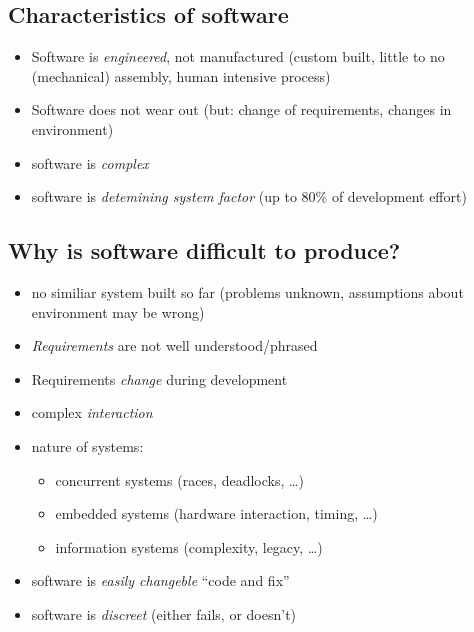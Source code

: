 \documentclass[a4paper, 10pt]{article}
\begin{document}
\subsection{Characteristics of software}
\begin{itemize}
	\item Software is \emph{engineered}, not manufactured (custom built, little to no (mechanical) assembly, human intensive process)
	\item Software does not wear out (but: change of requirements, changes in environment)
	\item software is \emph{complex}
	\item software is \emph{detemining system factor} (up to 80\% of development effort)
\end{itemize}

\subsection{Why is software difficult to produce?}
\begin{itemize}
	\item no similiar system built so far (problems unknown, assumptions about environment may be wrong)
	\item \emph{Requirements} are not well understood/phrased
	\item Requirements \emph{change} during development
	\item complex \emph{interaction}
	\item nature of systems:
		\begin{itemize}
			\item concurrent systems (races, deadlocks, \dots)
			\item embedded systems (hardware interaction, timing, \dots)
			\item information systems (complexity, legacy, \dots)
		\end{itemize}
	\item software is \emph{easily changeble} \follows ``code and fix''
	\item software is \emph{discreet} (either fails, or doesn't)
\end{itemize}
\end{document}
